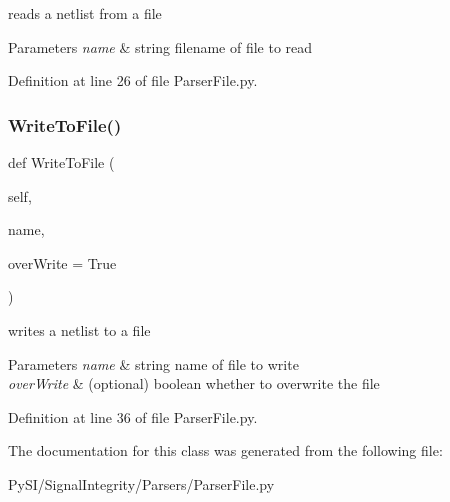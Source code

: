 reads a netlist from a file 


\begin{DoxyParams}{Parameters}
{\em name} & string filename of file to read \\
\hline
\end{DoxyParams}


Definition at line 26 of file Parser\+File.\+py.

\mbox{\label{classSignalIntegrity_1_1Parsers_1_1ParserFile_1_1ParserFile_a3ae128216b7f0540f8cd3793c4ed4903}} 
\subsubsection{\texorpdfstring{Write\+To\+File()}{WriteToFile()}}
{\footnotesize\ttfamily def Write\+To\+File (\begin{DoxyParamCaption}\item[{}]{self,  }\item[{}]{name,  }\item[{}]{over\+Write = {\ttfamily True} }\end{DoxyParamCaption})}



writes a netlist to a file 


\begin{DoxyParams}{Parameters}
{\em name} & string name of file to write \\
\hline
{\em over\+Write} & (optional) boolean whether to overwrite the file \\
\hline
\end{DoxyParams}


Definition at line 36 of file Parser\+File.\+py.



The documentation for this class was generated from the following file\+:\begin{DoxyCompactItemize}
\item 
Py\+S\+I/\+Signal\+Integrity/\+Parsers/Parser\+File.\+py\end{DoxyCompactItemize}
